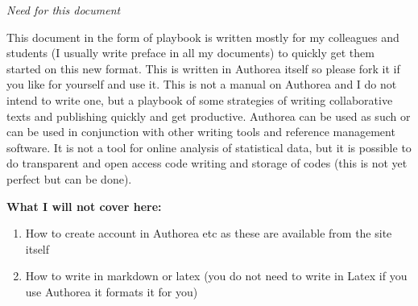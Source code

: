 \textit{Need for this document} 

This document in the form of playbook is written mostly for my colleagues and students (I usually write preface in all my documents) to quickly get them started on this new format. This is written in Authorea itself so please fork it if you like for yourself and use it. This is not a manual on Authorea and I do not intend to write one, but a playbook of some strategies of writing collaborative texts and publishing quickly and get productive. Authorea can be used as such or can be used in conjunction with other writing tools and reference management software. It is not a tool for online analysis of statistical data, but it is possible to do transparent and open access code writing and storage of codes (this is not yet perfect but can be done). 

\textbf{What I will not cover here:}

\begin{enumerate}
\item How to create account in Authorea etc as these are available from the site itself
\item How to write in markdown or latex (you do not need to write in Latex if you use Authorea it formats it for you)
\end{enumerate}




    
    
    
    